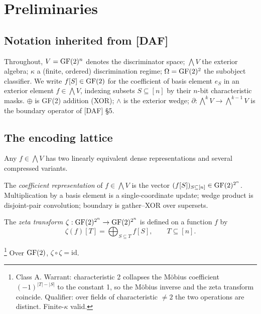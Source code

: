 \section{Preliminaries}\label{sec:prelim}

\subsection{Notation inherited from [DAF]}

Throughout, $V = \operatorname{GF}(2)^n$ denotes the discriminator space;
$\bigwedge V$ the exterior algebra; $\kappa$ a (finite,
ordered) discrimination regime; $\Omega = \operatorname{GF}(2)^2$ the
subobject classifier. We write $f[S] \in \operatorname{GF}(2)$ for the
coefficient of basis element $e_S$ in an exterior element
$f \in \bigwedge V$, indexing subsets $S \subseteq [n]$ by
their $n$-bit characteristic masks. $\oplus$ is GF(2)
addition (XOR); $\wedge$ is the exterior wedge;
$\partial: \bigwedge^k V \to \bigwedge^{k-1} V$ is the
boundary operator of [DAF] \S5.

\subsection{The encoding lattice}
\label{sec:encoding}

Any $f \in \bigwedge V$ has two linearly equivalent dense
representations and several compressed variants.

\begin{definition}\label{def:lambda}
  The \emph{coefficient representation} of $f \in \bigwedge V$
  is the vector $(f[S])_{S \subseteq [n]} \in \operatorname{GF}(2)^{2^n}$.
  Multiplication by a basis element is a single-coordinate
  update; wedge product is disjoint-pair convolution;
  boundary is gather--XOR over supersets.
\end{definition}

\begin{definition}\label{def:zeta}
  The \emph{zeta transform} $\zeta: \operatorname{GF}(2)^{2^n} \to
  \operatorname{GF}(2)^{2^n}$ is defined on a function $f$ by
  \begin{equation}
    \zeta(f)[T] = \bigoplus_{S \subseteq T} f[S],
    \qquad T \subseteq [n].
  \end{equation}
\end{definition}

\begin{proposition}
  \label{prop:zeta-involution}
  \footnote{Class \textsf{A}. Warrant: characteristic 2
  collapses the M\"{o}bius coefficient $(-1)^{|T| - |S|}$
  to the constant 1, so the M\"{o}bius inverse and the
  zeta transform coincide. Qualifier: over fields of
  characteristic $\neq 2$ the two operations are distinct.
  Finite-$\kappa$ valid.}
  Over $\operatorname{GF}(2)$, $\zeta \circ \zeta = \mathrm{id}$.
\end{proposition}

